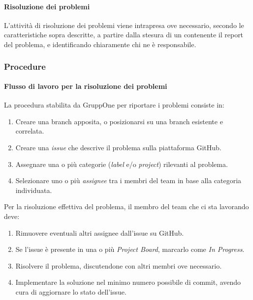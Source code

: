 \documentclass[../../norme-di-progetto.tex]{subfiles}
\begin{document}
\paragraph{Risoluzione dei problemi}%
\label{par:risoluzione_dei_problemi}

L'attività di risoluzione dei problemi viene intrapresa ove necessario, secondo le caratteristiche sopra descritte, a partire dalla stesura di un  contenente il report del problema, e identificando chiaramente chi ne è responsabile.

\subsubsection{Procedure}%
\label{subs:risoluzione_dei_problemi/procedure}

\paragraph{Flusso di lavoro per la risoluzione dei problemi}%
\label{par:flusso_di_lavoro_per_la_risoluzione_dei_problemi}

La procedura stabilita da GruppOne per riportare i problemi consiste in:

\begin{enumerate}
  \item Creare una branch apposita, o posizionarsi su una branch esistente e correlata.
  \item Creare una \textit{issue} che descrive il problema sulla piattaforma GitHub.
  \item Assegnare una o più categorie (\textit{label} e/o \textit{project}) rilevanti al problema.
  \item Selezionare uno o più \textit{assignee} tra i membri del team in base alla categoria individuata.
\end{enumerate}

Per la risoluzione effettiva del problema, il membro del team che ci sta lavorando deve:

\begin{enumerate}
  \item Rimuovere eventuali altri assignee dall'issue su GitHub.
  \item Se l'issue è presente in una o più \textit{Project Board}, marcarlo come \textit{In Progress}.
  \item Risolvere il problema, discutendone con altri membri ove necessario.
  \item Implementare la soluzione nel minimo numero possibile di commit, avendo cura di aggiornare lo stato dell'issue.
\end{enumerate}
\end{document}
